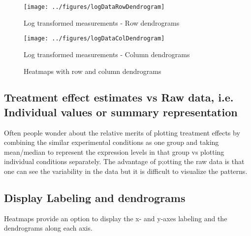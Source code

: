 \documentclass[12pt, oneside, letterpaper]{article}
\begin{document}
\begin{figure*}[p]

\begin{minipage}[t]{2.5in}
\begin{center}
\texttt{[image: ../figures/logDataRowDendrogram]}
\caption{Log transformed measurements - Row dendrograms}
\label{Log transformed measurements - Row dendrograms}
\end{center}
\end{minipage}
\hfill
\begin{minipage}[t]{2.5in}
\begin{center}
\texttt{[image: ../figures/logDataColDendrogram]}
\caption{Log transformed measurements - Column dendrograms}
\label{Log transformed measurements - Column dendrograms}
\end{center}
\end{minipage}

\caption{Heatmaps with row and column dendrograms}
\end{figure*}

\subsection*{Treatment effect estimates vs Raw data, i.e. Individual
	    values or summary representation} 
        Often people wonder about the relative merits of plotting
        treatment effects by combining the similar experimental
        conditions as one group and taking mean/median to represent
        the expression levels in that group vs plotting individual
        conditions separately. The advantage of p;otting the raw
        data is that one can see the variability in the data but it
        is difficult to visualize the patterns.

\subsection*{Display Labeling and dendrograms}
	Heatmaps provide an option to display the x- and y-axes
labeling and the dendrograms along each axis. 
	
\end{document}
